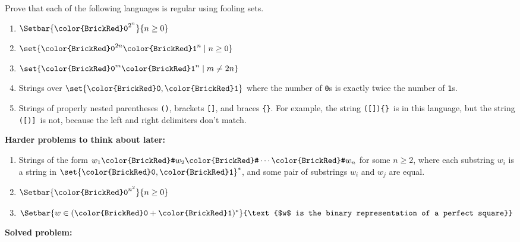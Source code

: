 \documentclass[11pt]{article}
\def\Sym#1{\texttt{\color{BrickRed}#1}}
\def\LP{\Sym{\large (}}
\def\RP{\Sym{\large )}}
\def\LB{\Sym{\large [}}
\def\RB{\Sym{\large ]}}
\def\LC{\Sym{\large \{}}
\def\RC{\Sym{\large \}}}
\begin{document}

\noindent
Prove that each of the following languages is  regular using fooling sets.

\bigskip
\begin{enumerate}
\parindent 1.5em \itemsep 4ex

\item
$\Setbar{\Sym{0}^{2^n}}{n\ge 0}$

\item
$\set{\Sym0^{2n}\Sym1^n\mid n\ge 0}$

\item
$\set{\Sym0^m\Sym1^n\mid m\ne 2n}$

\item
Strings over $\set{\Sym0,\Sym1}$ where the number of \Sym0s is exactly twice the number of \Sym1s.

\item
Strings of properly nested parentheses \LP \RP, brackets \LB \RB, and braces \LC \RC.  For example, the string \LP\LB\RB\RP\LC\RC\ is in this language, but the string \LP\LB\RP\RB\ is not, because the left and right delimiters don't match.


\end{enumerate}


\bigskip
\noindent\textbf{Harder problems to think about later:}

\begin{enumerate}\itemsep 4ex
\setcounter{enumi}5

\item
Strings of the form $w_1\Sym{\#}w_2\Sym{\#}\cdots\Sym{\#}w_n$ for some $n\ge 2$, where each substring $w_i$ is a string in $\set{\Sym0,\Sym1}^*$, and some pair of substrings $w_i$ and $w_j$ are equal.

\item
$\Setbar{\Sym{0}^{n\smash{^2}}\strut}{n\ge 0}$

\Hard
\item
$\Setbar{w\in (\Sym{0}+\Sym{1})^*}{\text{$w$ is the binary representation of a perfect square}}$


\end{enumerate}


\newpage
\noindent\textbf{Solved problem:}
\end{document}
